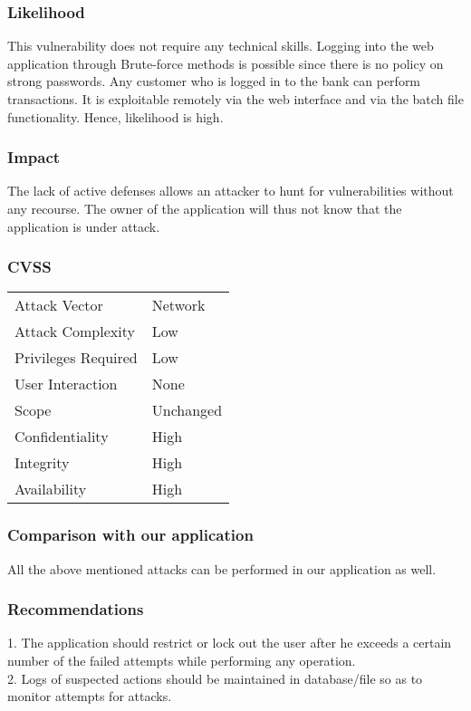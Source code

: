 \subsubsection{Likelihood}
This vulnerability does not require any technical skills. Logging into the web application through Brute-force methods is possible since there is no policy on strong passwords. Any customer who is logged in to the bank can perform transactions. It is exploitable remotely via the
web interface and via the batch file functionality.
Hence, likelihood is high.

\subsubsection{Impact}
The lack of active defenses allows an attacker to hunt for vulnerabilities without any recourse. The owner of the application will thus not know that the application is under attack. 

\subsubsection{CVSS}
\begin{tabular}{l | l}
Attack Vector		& Network \\
Attack Complexity	& Low \\
Privileges Required & Low \\
User Interaction	& None \\
Scope				& Unchanged \\
Confidentiality		& High \\
Integrity			& High \\
Availability		& High
\end{tabular}

\subsubsection{Comparison with our application}
All the above mentioned attacks can be performed in our application as well.

\subsubsection{Recommendations}
1. The application should restrict or lock out the user after he exceeds a certain number of the failed attempts while performing any operation. \\
2. Logs of suspected actions should be maintained in database/file so as to monitor attempts for attacks.\\
\clearpage